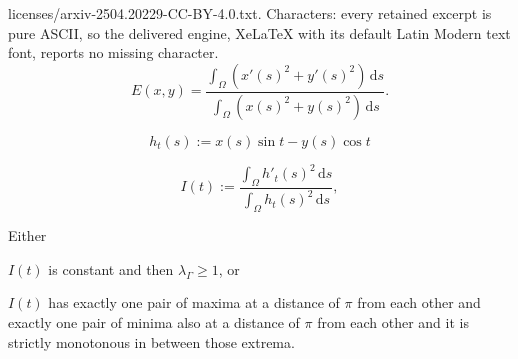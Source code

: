\documentclass[10pt,a4paper]{amsart}
\newcommand{\ds}{\,\mathrm{d}s}
\begin{document}
licenses/arxiv-2504.20229-CC-BY-4.0.txt. Characters: every retained excerpt is pure ASCII, so the delivered engine, XeLaTeX with its default Latin Modern text font, reports no missing character.
\begin{equation}\label{EqLambda}
    E(x,y) = \frac{\int_\Omega \left(x'(s)^2 + y'(s)^2 \right)\ds}{\int_\Omega \left(x(s)^2 + y(s)^2 \right)\ds}.
\end{equation}

\begin{equation} \label{eq:def_h}
    h_t(s) :=  x(s) \sin t - y(s) \cos t
\end{equation} 

\begin{equation} \label{eq:def_I}
    I(t) := \frac{\int_\Omega h'_t(s)^2 \ds}{\int_\Omega h_t(s)^2 \ds},
\end{equation}%

\begin{lemma} \label{lem:facts_about_I}
    Either 
    
    $I(t)$ is constant and then $\lambda_\Gamma\ge 1$, or 
    
    $I(t)$ has exactly one pair of maxima at a distance of $\pi$ from each other and exactly one pair of minima also at a distance of $\pi$ from each other and it is strictly monotonous in between those extrema.
\end{lemma}
\end{document}

